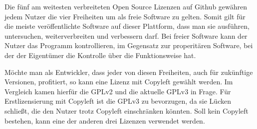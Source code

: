 
Die fünf am weitesten verbreiteten Open Source Lizenzen auf Github gew\"ahren jedem Nutzer die vier Freiheiten um als freie Software zu gelten. Somit gilt f\"ur die meiste ver\"offentlichte Software auf dieser Plattform, dass man sie ausf\"uhren, untersuchen, weiterverbreiten und verbessern darf. Bei freier Software kann der Nutzer das Programm kontrollieren, im Gegensatz zur properit\"aren Software, bei der der Eigentümer die Kontrolle \"uber die Funktionsweise hat. 

Möchte man als Entwickler, dass jeder von diesen Freiheiten, auch f\"ur zuk\"unftige Versionen, profitiert, so kann eine Lizenz mit Copyleft gew\"ahlt werden. Im Vergleich kamen hierf\"ur die GPLv2 und die aktuelle GPLv3 in Frage. F\"ur Erstlizensierung mit Copyleft ist die GPLv3 zu bevorzugen, da sie L\"ucken schließt, die den Nutzer trotz Copyleft einschr\"anken k\"onnten. Soll kein Copyleft bestehen, kann eine der anderen drei Lizenzen verwendet werden.